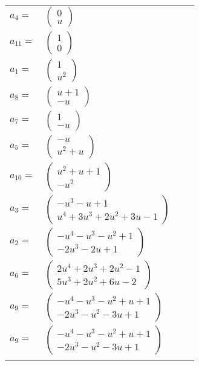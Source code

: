 \documentclass[1p]{elsarticle_modified}
\theoremstyle{definition}
\begin{document}
\begin{tabular}{m{7pt} m{180pt} m{7pt} m{180pt} }
\flushright $a_{4}=$&$\begin{pmatrix}0\\u\end{pmatrix}$ \\
\flushright $a_{11}=$&$\begin{pmatrix}1\\0\end{pmatrix}$ \\
\flushright $a_{1}=$&$\begin{pmatrix}1\\u^2\end{pmatrix}$ \\
\flushright $a_{8}=$&$\begin{pmatrix}u+1\\- u\end{pmatrix}$ \\
\flushright $a_{7}=$&$\begin{pmatrix}1\\- u\end{pmatrix}$ \\
\flushright $a_{5}=$&$\begin{pmatrix}- u\\u^2+u\end{pmatrix}$ \\
\flushright $a_{10}=$&$\begin{pmatrix}u^2+u+1\\- u^2\end{pmatrix}$ \\
\flushright $a_{3}=$&$\begin{pmatrix}- u^3- u+1\\u^4+3 u^3+2 u^2+3 u-1\end{pmatrix}$ \\
\flushright $a_{2}=$&$\begin{pmatrix}- u^4- u^3- u^2+1\\-2 u^3-2 u+1\end{pmatrix}$ \\
\flushright $a_{6}=$&$\begin{pmatrix}2 u^4+2 u^3+2 u^2-1\\5 u^3+2 u^2+6 u-2\end{pmatrix}$ \\
\flushright $a_{9}=$&$\begin{pmatrix}- u^4- u^3- u^2+u+1\\-2 u^3- u^2-3 u+1\end{pmatrix}$\\ \flushright $a_{9}=$&$\begin{pmatrix}- u^4- u^3- u^2+u+1\\-2 u^3- u^2-3 u+1\end{pmatrix}$\\&\end{tabular}
\end{document}

